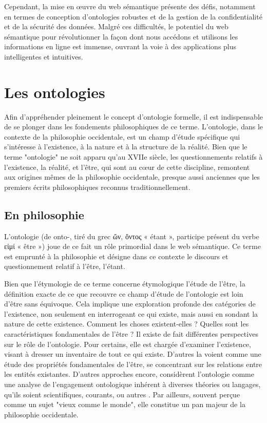 \documentclass[12pt]{report}
\begin{document}
Cependant, la mise en œuvre du web sémantique présente des défis, notamment en termes de conception d'ontologies robustes et de la gestion de la confidentialité et de la sécurité des données. Malgré ces difficultés, le potentiel du web sémantique pour révolutionner la façon dont nous accédons et utilisons les informations en ligne est immense, ouvrant la voie à des applications plus intelligentes et intuitives.

\section{Les ontologies}
Afin d'appréhender pleinement le concept d'ontologie formelle, il est indispensable de se plonger dans les fondements philosophiques de ce terme. L'ontologie, dans le contexte de la philosophie occidentale, est un champ d'étude spécifique qui s'intéresse à l'existence, à la nature et à la structure de la réalité. Bien que le terme "ontologie" ne soit apparu qu'au XVIIe siècle, les questionnements relatifs à l'existence, la réalité, et l'être, qui sont au cœur de cette discipline, remontent aux origines mêmes de la philosophie occidentale, presque aussi anciennes que les premiers écrits philosophiques reconnus traditionnellement.

\subsection{En philosophie}
L'ontologie (de onto-, tiré du grec \textgreek{ὤν, ὄντος} « étant », participe présent du verbe \textgreek{εἰμί} « être ») joue de ce fait un rôle primordial dans le web sémantique. Ce terme est emprunté à la philosophie et désigne dans ce contexte le discours et questionnement relatif à l'être, l'étant. 

Bien que l'étymologie de ce terme concerne étymologique l'étude de l'être, la définition exacte de ce que recouvre ce champ d'étude de l'ontologie est loin d'être sans équivoque. Cela implique une exploration profonde des catégories de l'existence, non seulement en interrogeant ce qui existe, mais aussi en sondant la nature de cette existence. Comment les choses existent-elles ? Quelles sont les caractéristiques fondamentales de l'être ? Il existe de fait différentes perspectives sur le rôle de l'ontologie. Pour certains, elle est chargée d'examiner l'existence, visant à dresser un inventaire de tout ce qui existe. D'autres la voient comme une étude des propriétés fondamentales de l'être, se concentrant sur les relations entre les entités existantes. D'autres approches encore, considèrent l'ontologie comme une analyse de l'engagement ontologique inhérent à diverses théories ou langages, qu'ils soient scientifiques, courants, ou autres\autocite{arapinis2018ontologie} .
Par ailleurs, souvent perçue comme un sujet "vieux comme le monde", elle constitue un pan majeur de la philosophie occidentale.
\end{document}
